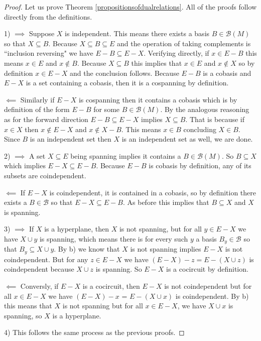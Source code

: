 \begin{proof}
    Let us prove Theorem \ref{propositionsofdualrelations}. All of the proofs follow directly from the definitions.

    1) $\implies$ Suppose $X$ is independent. This means there exists a basis $B \in \mathcal{B}(M)$ so that $X \subseteq B$. Because $X \subseteq B \subseteq E$ and the operation of taking complements is ``inclusion reversing" we have $E-B \subseteq E - X$. Verifying directly, if $x \in E - B$ this means $x \in E$ and $x \notin B$. Because $X \subseteq B$ this implies that $x \in E$ and $x \notin X$ so by definition $x \in E - X$ and the conclusion follows. Because $E - B$ is a cobasis and $E - X$ is a set containing a cobasis, then it is a cospanning by definition.

    $\impliedby$ Similarly if $E - X$ is cospanning then it contains a cobasis which is by definition of the form $E - B$ for some $B \in \mathcal{B}(M)$. By the analogous reasoning as for the forward direction $E - B \subseteq E - X$ implies $X \subseteq B$. That is because if $x \in X$ then $x \notin E - X$ and $x \notin X - B$. This means $x \in B$ concluding $X \in B$. Since $B$ is an independent set then $X$ is an independent set as well, we are done.

    2) $\implies$ A set $X\subseteq E$ being spanning implies it contains a $B \in \mathcal{B}(M)$. So  $B \subseteq X$ which implies $E - X \subseteq E - B$. Because $E - B$ is cobasis by definition, any of its subsets are coindependent. 

    $\impliedby$ If $E - X$ is coindependent, it is contained in a cobasis, so by definition there exists a $B \in \mathcal{B}$ so that $E - X \subseteq E - B$. As before this implies that $B \subseteq X$ and $X$ is spanning.

    3)  $\implies$ If $X$ is a hyperplane, then $X$ is not spanning, but for all $y \in E - X$ we have $X \cup y$ is spanning, which means there is for every such $y$ a basis $B_y \in \mathcal{B}$ so that $B_y \subseteq X \cup y $. By b) we know that $X$ is not spanning implies $E - X$ is not coindependent. But for any $z \in E - X$ we have $(E-X)-z = E - (X \cup z)$ is coindependent because $X \cup z$ is spanning. So $E - X$ is a cocircuit by definition.

    $\impliedby$ Conversly, if $E - X$ is a cocircuit, then $E-X$ is not coindependent but for all $x \in E - X$ we have $(E - X) - x$ = $E - (X \cup x)$ is coindependent. By b) this means that $X$ is not spanning but for all $x \in E-X$, we have $X \cup x$ is spanning, so $X$ is a hyperplane.

    4) This follows the same process as the previous proofs.
\end{proof}

